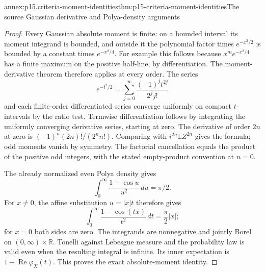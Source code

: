 \begin{annexitem}{annex:p15.criteria-moment-identities}{thm:p15-criteria-moment-identities}{The source Gaussian derivative and Polya-density arguments}
\begin{proof}
Every Gaussian absolute moment is finite: on a bounded
interval its moment integrand is bounded, and outside
it the polynomial factor times \(e^{-x^2/2}\) is bounded
by a constant times \(e^{-x^2/4}\).
For example this follows because \(x^m e^{-x^2/4}\)
has a finite maximum on the positive half-line, by
differentiation.
The moment-derivative theorem therefore applies at
every order. The series
\[
 e^{-t^2/2}=\sum_{j=0}^\infty
                         \frac{(-1)^j t^{2j}}{2^j j!}
\]
and each finite-order differentiated series converge
uniformly on compact \(t\)-intervals by the ratio test.
Termwise differentiation follows by integrating the
uniformly converging derivative series, starting at zero.
The derivative of order \(2n\) at zero is
\((-1)^n(2n)!/(2^n n!)\). Comparing with
\(i^{2n}\mathbb EZ^{2n}\) gives the formula; odd
moments vanish by symmetry. The factorial cancellation
equals the product of the positive odd integers, with
the stated empty-product convention at \(n=0\).

The already normalized even Polya density gives
\[
 \int_0^\infty\frac{1-\cos u}{u^2}\,du=\pi/2.
\]
For \(x\ne0\), the affine substitution \(u=|x|t\)
therefore gives
\[
 \int_0^\infty\frac{1-\cos(tx)}{t^2}\,dt=\frac\pi2|x|;
\]
for \(x=0\) both sides are zero.
The integrands are nonnegative and jointly Borel on
\((0,\infty)\times\mathbb R\). Tonelli against Lebesgue
measure and the probability law is valid even when
the resulting integral is infinite.
Its inner expectation is \(1-\operatorname{Re}\varphi_X(t)\).
This proves the exact absolute-moment identity.
\end{proof}
\end{annexitem}

